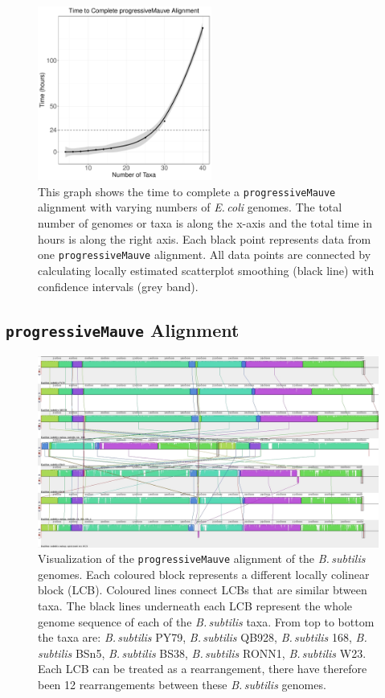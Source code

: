 \documentclass[11pt]{article}
\newcommand{\ecol}{\textit{E.\,coli}\xspace}
\newcommand{\bass}{\textit{B.\,subtilis}\xspace}
\newcommand{\p}{\texttt{progressiveMauve}\xspace}
\begin{document}
	\begin{figure}[H]
	\begin{center}
		\includegraphics[width=0.51\textwidth]{./figs/mauve_time_plot}
		\caption{\label{fig:mauvetimeplot} This graph shows the time to complete a \p alignment with varying numbers of \ecol genomes. The total number of genomes or taxa is along the x-axis and the total time in hours is along the right axis. Each black point represents data from one \p alignment. All data points are connected by calculating locally estimated scatterplot smoothing (black line) with confidence intervals (grey band).}
	\end{center}
\end{figure}
	
	
	\subsection{\p Alignment}
	\begin{figure}[H]
		\begin{center}
			\includegraphics[width=\textwidth]{./figs/Bacillus_alignment_mauve.jpg}
			\caption{\label{fig:mauvealn} Visualization of the \p alignment of the \bass genomes. Each coloured block represents a different locally colinear block (LCB). Coloured lines connect LCBs that are similar btween taxa. The black lines underneath each LCB represent the whole genome sequence of each of the \bass taxa. From top to bottom the taxa are: \bass PY79, \bass QB928, \bass 168, \bass BSn5, \bass BS38, \bass RONN1, \bass W23.  Each LCB can be treated as a rearrangement, there have therefore been 12 rearrangements between these \bass genomes.}
		\end{center}
	\end{figure}
\end{document}
